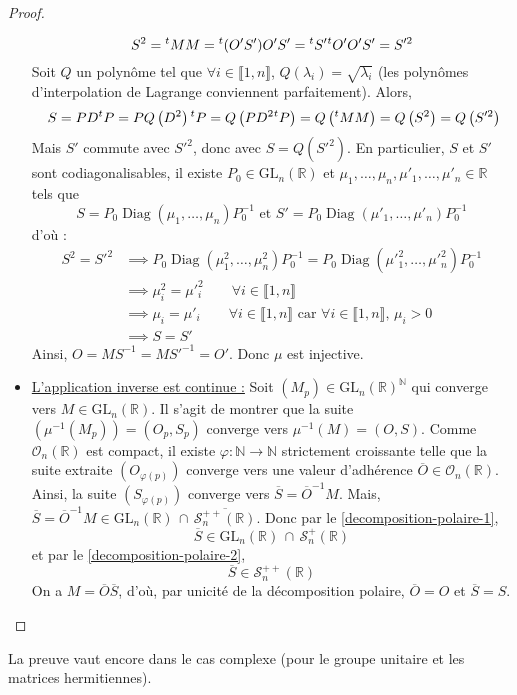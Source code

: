 \begin{proof}
\begin{itemize}
      \[ S^2 = \mathstrut ^t M M = \mathstrut ^t (O'S') O'S' = \mathstrut ^t S' \mathstrut ^t O' O' S' = S'^{2} \]
      Soit $Q$ un polynôme tel que $\forall i \in \llbracket 1, n \rrbracket$, $Q(\lambda_i) = \sqrt{\lambda_i}$ (les polynômes d'interpolation de Lagrange conviennent parfaitement). Alors,
      \[\ S = PD \mathstrut ^t P = PQ \left(D^2 \right) \mathstrut ^t P = Q \left(PD^2 \mathstrut ^t P \right) = Q \left(\mathstrut ^t M M \right) = Q \left(S^2 \right) = Q \left(S'^2 \right) \]
      Mais $S'$ commute avec $S'^2$, donc avec $S = Q \left(S'^2 \right)$. En particulier, $S$ et $S'$ sont codiagonalisables, il existe $P_0 \in \mathrm{GL}_n(\mathbb{R})$ et $\mu_1, \dots, \mu_n, \mu'_1, \dots, \mu'_n \in \mathbb{R}$ tels que
      \[ S = P_0 \operatorname{Diag}(\mu_1, \dots, \mu_n) P_0^{-1} \text{ et } S' = P_0 \operatorname{Diag} \left (\mu'_1, \dots, \mu'_n \right) P_0^{-1} \]
      d'où :
      \begin{align*}
        S^2 = S'^2 & \implies P_0 \operatorname{Diag} \left(\mu^2_1, \dots, \mu^2_n \right) P_0^{-1} = P_0 \operatorname{Diag} \left (\mu'^2_1, \dots, \mu'^2_n \right) P_0^{-1} \\
        & \implies \mu^2_i = \mu'^2_i \qquad \forall i \in \llbracket 1, n \rrbracket \\
        & \implies \mu_i = \mu'_i \qquad \forall i \in \llbracket 1, n \rrbracket \text{ car } \forall i \in \llbracket 1, n \rrbracket, \, \mu_i > 0 \\
        & \implies S = S'
      \end{align*}
      Ainsi, $O = MS^{-1} = MS'^{-1} = O'$. Donc $\mu$ est injective.
      \item \uline{L'application inverse est continue :} Soit $(M_p) \in \mathrm{GL}_n(\mathbb{R})^{\mathbb{N}}$ qui converge vers $M \in \mathrm{GL}_n(\mathbb{R})$. Il s'agit de montrer que la suite $\left (\mu^{-1} \left (M_p \right) \right) = (O_p, S_p)$ converge vers $\mu^{-1}(M) = (O, S)$. Comme $\mathcal{O}_n(\mathbb{R})$ est compact, il existe $\varphi : \mathbb{N} \rightarrow \mathbb{N}$ strictement croissante telle que la suite extraite $(O_{\varphi(p)})$ converge vers une valeur d'adhérence $\overline{O} \in \mathcal{O}_n(\mathbb{R})$. Ainsi, la suite $(S_{\varphi(p)})$ converge vers $\overline{S} = \overline{O}^{-1} M$.
      \newpar
      Mais, $\overline{S} = \overline{O}^{-1} M \in \mathrm{GL}_n(\mathbb{R}) \, \cap \, \overline{\mathcal{S}_n^{++}(\mathbb{R})}$. Donc par le \cref{decomposition-polaire-1},
      \[ \overline{S} \in \mathrm{GL}_n(\mathbb{R}) \, \cap \, \mathcal{S}_n^{+}(\mathbb{R}) \]
      et par le \cref{decomposition-polaire-2},
      \[ \overline{S} \in \mathcal{S}_n^{++}(\mathbb{R}) \]
      On a $M = \overline{O} \overline{S}$, d'où, par unicité de la décomposition polaire, $\overline{O} = O$ et $\overline{S} = S$.
    \end{itemize}
  \end{proof}

  \begin{remark}
    La preuve vaut encore dans le cas complexe (pour le groupe unitaire et les matrices hermitiennes).
  \end{remark}

